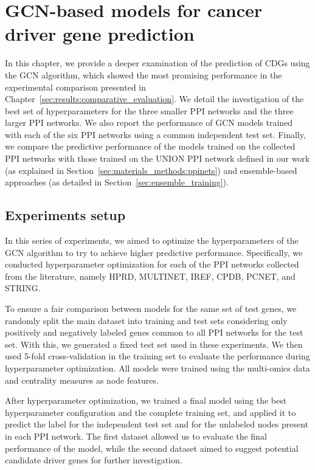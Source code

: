 \chapter{GCN-based models for cancer driver gene prediction}
\label{sec:gcn_model}


In this chapter, we provide a deeper examination of the prediction of CDGs using the GCN algorithm, which showed the most promising performance in the experimental comparison presented in Chapter~\ref{sec:results:comparative_evaluation}. We detail the investigation of the best set of hyperparameters for the three smaller PPI networks and the three larger PPI networks. We also report the performance of GCN models trained with each of the six PPI networks using a common independent test set. Finally, we compare the predictive performance of the models trained on the collected PPI networks with those trained on the UNION PPI network defined in our work (as explained in Section~\ref{sec:materials_methods:ppinets}) and ensemble-based approaches (as detailed in Section~\ref{sec:ensemble_training}).



\section{Experiments setup}
\label{sec:gcn_model:setup}

In this series of experiments, we aimed to optimize the hyperparameters of the GCN algorithm to try to achieve higher predictive performance. Specifically, we conducted hyperparameter optimization for each of the PPI networks collected from the literature, namely HPRD, MULTINET, IREF, CPDB, PCNET, and STRING.

To ensure a fair comparison between models for the same set of test genes, we randomly split the main dataset into training and test sets considering only positively and negatively labeled genes common to all PPI networks for the test set. With this, we generated a fixed test set used in these experiments. We then used 5-fold cross-validation in the training set to evaluate the performance during hyperparameter optimization. All models were trained using the multi-omics data and centrality measures as node features.

After hyperparameter optimization, we trained a final model using the best hyperparameter configuration and the complete training set, and applied it to predict the label for the independent test set and for the unlabeled nodes present in each PPI network. The first dataset allowed us to evaluate the final performance of the model, while the second dataset aimed to suggest potential candidate driver genes for further investigation.

